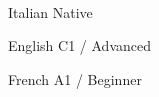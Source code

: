%
\hfill
%
\begin{minipage}[t]{0.30\textwidth}

    \\

    \begin{cvskills}

        \cvskill
        {Italian}
        {Native}

        \cvskill
        {English}
        {C1 / Advanced}

        \cvskill
        {French}
        {A1 / Beginner}

    \end{cvskills}

\end{minipage}

